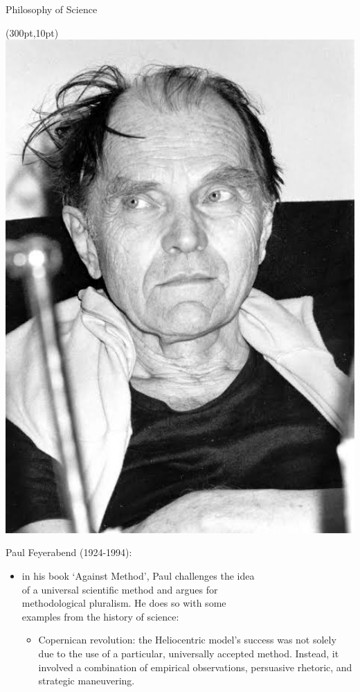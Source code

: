 \documentclass{beamer}
\begin{document}
\begin{frame}{Philosophy of Science}
	\begin{textblock*}{50pt}(300pt,10pt)
		\includegraphics[width=1\textwidth]{../images/Feyerabend.jpeg}
	\end{textblock*}
	Paul Feyerabend (1924-1994):
		\begin{itemize}
			\item<2-> in his book `Against Method', Paul challenges the idea \\of a universal scientific method and argues for \\methodological pluralism. He does so with some\\ examples from the history of science:
			\begin{itemize}
				\item<3-> Copernican revolution: the Heliocentric model's success was not solely due to the use of a particular, universally accepted method. Instead, it involved a combination of empirical observations, persuasive rhetoric, and strategic maneuvering. 

\end{itemize}
\end{itemize}
\end{frame}
\end{document}
